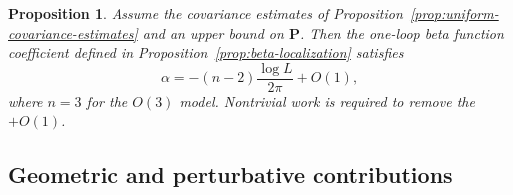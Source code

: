 \documentclass[11pt]{article}
\newcommand{\red}{\color{red}}
\numberwithin{equation}{section}
\newtheorem{proposition}[theorem]{Proposition}
\theoremstyle{definition}
\theoremstyle{plain}
\begin{document}
\begin{proposition}
  Assume the covariance estimates of Proposition~\ref{prop:uniform-covariance-estimates}
  and an upper bound on $\mathbf P$.
  Then the one-loop beta function coefficient defined in
  Proposition~\ref{prop:beta-localization} satisfies
  \begin{equation}
    \alpha = -(n-2)\frac{\log L}{2\pi} + O(1),
  \end{equation}
  where $n=3$ for the $O(3)$ model.
  {\red Nontrivial work is required to remove the $+O(1)$.}
\end{proposition}


 \subsection{Geometric and perturbative contributions}
\end{document}

